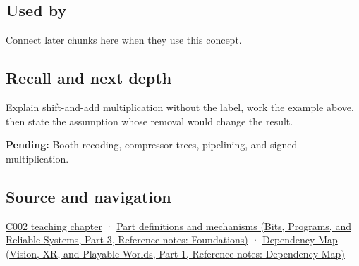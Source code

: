 \subsection{Used by}\label{appendix-a65290d66ed9-used-by}

\hypertarget{appendix-a65290d66ed9-used-by}{}

Connect later chunks here when they use this concept.

\subsection{Recall and next depth}\label{appendix-a65290d66ed9-recall-and-next-depth}

\hypertarget{appendix-a65290d66ed9-recall-and-next-depth}{}

Explain shift-and-add multiplication without the label, work the example above, then state the assumption whose removal would change the result.

\textbf{Pending:} Booth recoding, compressor trees, pipelining, and signed multiplication.

\subsection{Source and navigation}\label{appendix-a65290d66ed9-source-and-navigation}

\hypertarget{appendix-a65290d66ed9-source-and-navigation}{}

\hyperref[01-foundations-i-ch001-arithmetic-becomes-a-policy]{C002 teaching chapter} · \href{../01-Bits-Programs-and-Reliable-Systems-P03/main.pdf\#appendix-fd090d982a15}{Part definitions and mechanisms (Bits, Programs, and Reliable Systems, Part 3, Reference notes: Foundations)} · \href{../07-Vision-XR-and-Playable-Worlds-P01/main.pdf\#appendix-4ad47bdd269a}{Dependency Map (Vision, XR, and Playable Worlds, Part 1, Reference notes: Dependency Map)}
